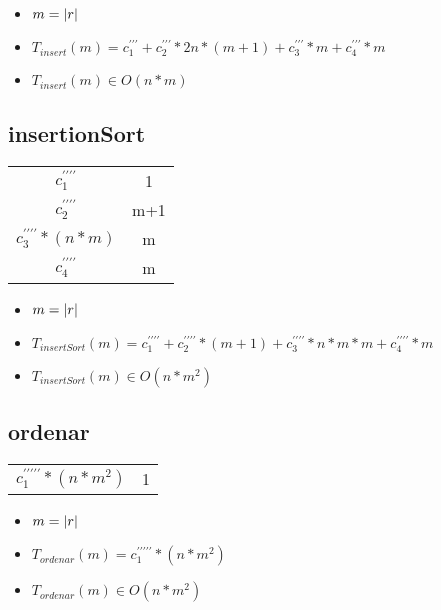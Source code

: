 \documentclass{article}
\begin{document}
    \begin{itemize}
        \item $m = |r|$
        \item $T_{insert}(m) = c^{\prime\prime\prime}_1 + c^{\prime\prime\prime}_2 * 2n * (m+1) + c^{\prime\prime\prime}_3 * m + c^{\prime\prime\prime}_4 * m $
        \item $T_{insert}(m) \in O(n*m)$
    \end{itemize}

    \subsection*{insertionSort}

    \begin{minipage}{0.70\textwidth}
        
    \end{minipage}
    \hfill
    \begin{minipage}{0.25\textwidth}
        \begin{tabular}{|c|c}

            $c^{\prime\prime\prime\prime}_1$ & 1 \\
            $c^{\prime\prime\prime\prime}_2$ & m+1 \\
            $c^{\prime\prime\prime\prime}_3*(n*m)$ & m \\
            $c^{\prime\prime\prime\prime}_4$ & m \\

        \end{tabular}
    \end{minipage}

    \begin{itemize}
        \item $m = |r|$
        \item $T_{insertSort}(m) = c^{\prime\prime\prime\prime}_1 + c^{\prime\prime\prime\prime}_2 * (m+1) + c^{\prime\prime\prime\prime}_3*n*m*m + c^{\prime\prime\prime\prime}_4 * m$
        \item $T_{insertSort}(m) \in O(n*m^{2})$
    \end{itemize}

    \subsection*{ordenar}

    \begin{minipage}{0.70\textwidth}
        
    \end{minipage}
    \hfill
    \begin{minipage}{0.25\textwidth}
        \begin{tabular}{|c|c}

            $c^{\prime\prime\prime\prime\prime}_1*(n*m^2)$ & 1 \\

        \end{tabular}
    \end{minipage}

    \begin{itemize}
        \item $m = |r|$
        \item $T_{ordenar}(m) = c^{\prime\prime\prime\prime\prime}_1*(n*m^2)$
        \item $T_{ordenar}(m) \in O(n*m^{2})$
    \end{itemize}
\end{document}
